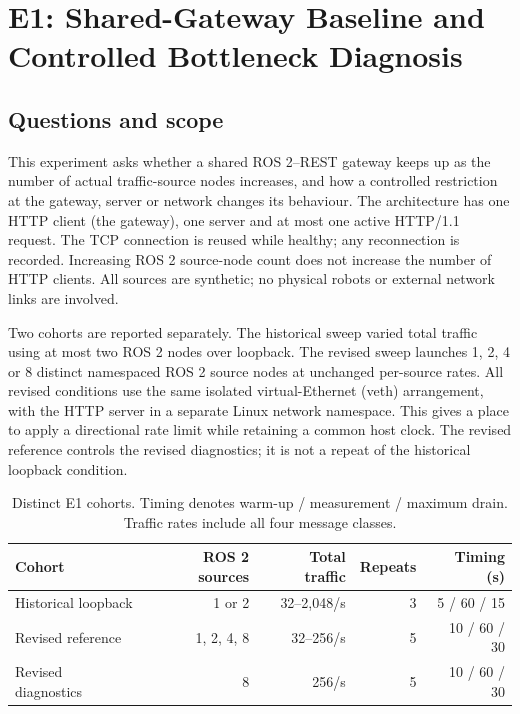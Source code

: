 \section{E1: Shared-Gateway Baseline and Controlled Bottleneck Diagnosis}

\subsection{Questions and scope}

This experiment asks whether a shared ROS 2--REST gateway keeps up as the number of actual traffic-source nodes increases, and how a controlled restriction at the gateway, server or network changes its behaviour. The architecture has one HTTP client (the gateway), one server and at most one active HTTP/1.1 request. The TCP connection is reused while healthy; any reconnection is recorded. Increasing ROS 2 source-node count does not increase the number of HTTP clients. All sources are synthetic; no physical robots or external network links are involved.

Two cohorts are reported separately. The historical sweep varied total traffic using at most two ROS 2 nodes over loopback. The revised sweep launches 1, 2, 4 or 8 distinct namespaced ROS 2 source nodes at unchanged per-source rates. All revised conditions use the same isolated virtual-Ethernet (veth) arrangement, with the HTTP server in a separate Linux network namespace. This gives a place to apply a directional rate limit while retaining a common host clock. The revised reference controls the revised diagnostics; it is not a repeat of the historical loopback condition.

\begin{table}[H]
\centering\small
\setlength{\tabcolsep}{4pt}
\begin{tabular}{lrrrr}
\hline
Cohort & ROS 2 sources & Total traffic & Repeats & Timing (s) \\
\hline
Historical loopback & 1 or 2 & 32--2,048/s & 3 & 5 / 60 / 15 \\
Revised reference & 1, 2, 4, 8 & 32--256/s & 5 & 10 / 60 / 30 \\
Revised diagnostics & 8 & 256/s & 5 & 10 / 60 / 30 \\
\hline
\end{tabular}
\caption{Distinct E1 cohorts. Timing denotes warm-up / measurement / maximum drain. Traffic rates include all four message classes.}
\label{tab:e1r-cohorts}
\end{table}


